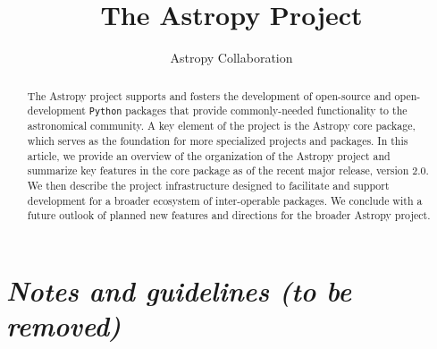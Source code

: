 \documentclass[modern]{aastex61}
\newcommand{\package}[1]{\texttt{#1}\xspace}
\newcommand{\python}{\package{Python}\xspace}
\newcommand{\astropy}{Astropy\xspace}
\begin{document}
\draft{\today}

\title{The Astropy Project}


\author{Astropy Collaboration}

\begin{abstract}
The \astropy project supports and fosters the development of open-source and open-development
\python packages that provide commonly-needed functionality to the astronomical
community.
A key element of the project is the \astropy core package, which serves as the
foundation for more specialized projects and packages.
In this article, we provide an overview of the organization of the \astropy
project and summarize key features in the core package as of the recent major
release, version 2.0.
We then describe the project infrastructure designed to facilitate and support
development for a broader ecosystem of inter-operable packages.
We conclude with a future outlook of planned new features and directions for the
broader \astropy project.
\end{abstract}

\keywords{}

\section*{\textit{Notes and guidelines (to be removed)}}
\end{document}
